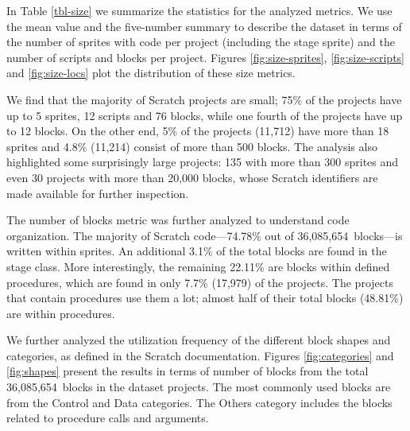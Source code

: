 \documentclass{sig-alternate}
\newcommand{\nLOC}{36,085,654}
\begin{document}
In Table \ref{tbl-size} we summarize the statistics for the analyzed metrics. We use the mean value and the five-number summary to describe the dataset in terms of the number of sprites with code per project (including the stage sprite) and the number of scripts and blocks per project. Figures \ref{fig:size-sprites}, \ref{fig:size-scripts} and \ref{fig:size-locs} plot the distribution of these size metrics.

We find that the majority of Scratch projects are small; 75\% of the projects have up to 5 sprites, 12 scripts and 76 blocks, while one fourth of the projects have up to 12 blocks. On the other end, 5\% of the projects (11,712) have more than 18 sprites and 4.8\% (11,214) consist of more than 500 blocks. The analysis also highlighted some surprisingly large projects: 135 with more than 300 sprites and even 30 projects with more than 20,000 blocks, whose Scratch identifiers are made available for further inspection.\footnotemark[\ref{repo}]

The number of blocks metric was further analyzed to understand code organization. The majority of Scratch code---74.78\% out of \nLOC~blocks---is written within sprites. An additional 3.1\% of the total blocks are found in the stage class. More interestingly, the remaining 22.11\% are blocks within defined procedures, which are found in only 7.7\% (17,979) of the projects. The projects that contain procedures use them a lot; almost half of their total blocks (48.81\%) are within procedures.

We further analyzed the utilization frequency of the different block shapes and categories, as defined in the Scratch documentation. Figures \ref{fig:categories} and \ref{fig:shapes} present the results in terms of number of blocks from the total \nLOC~blocks in the dataset projects. The most commonly used blocks are from the Control and Data categories. The Others category includes the blocks related to procedure calls and arguments.
\end{document}
